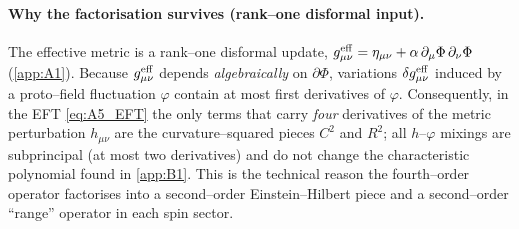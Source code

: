 \documentclass{iopjournal}
\begin{document}
\paragraph{Why the factorisation survives (rank–one disformal input).}
The effective metric is a rank–one disformal update,
$g^{\rm eff}_{\mu\nu}=\eta_{\mu\nu}+\alpha\,\partial_\mu\Phi\,\partial_\nu\Phi$ (\cref{app:A1}).
Because $g^{\rm eff}_{\mu\nu}$ depends \emph{algebraically} on $\partial\Phi$, variations
$\delta g^{\rm eff}_{\mu\nu}$ induced by a proto–field fluctuation $\varphi$ contain at most first derivatives of $\varphi$. Consequently, in the EFT
\eqref{eq:A5_EFT} the only terms that carry \emph{four} derivatives of the metric perturbation $h_{\mu\nu}$ are the curvature–squared pieces $C^2$ and $R^2$; all $h$–$\varphi$ mixings are subprincipal (at most two derivatives) and do not change the characteristic polynomial found in \cref{app:B1}.
This is the technical reason the fourth–order operator
factorises into a second–order Einstein–Hilbert piece and a second–order ``range'' operator in each spin sector.
\end{document}
